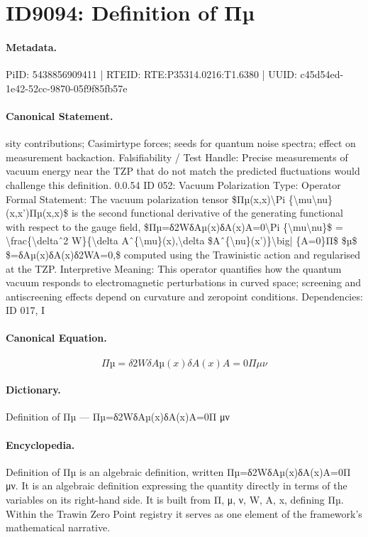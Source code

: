 \section*{ID9094: Definition of Πµ}
\paragraph{Metadata.}
PiID: 5438856909411 | RTEID: RTE:P35314.0216:T1.6380 | UUID: c45d54ed-1e42-52cc-9870-05f9f85fb57e

\paragraph{Canonical Statement.}
sity contributions; Casimirtype forces; seeds for quantum noise spectra; effect on measurement backaction. Falsifiability / Test Handle: Precise measurements of vacuum energy near the TZP that do not match the predicted fluctuations would challenge this definition. 0.0.54 ID 052: Vacuum Polarization Type: Operator Formal Statement: The vacuum polarization tensor \$Πµ(x,x)\textbackslash{}Pi \{\textbackslash{}mu\textbackslash{}nu\}(x,x’)Πµ(x,x)\$ is the second functional derivative of the generating functional with respect to the gauge field, \$Πµ=δ2WδAµ(x)δA(x)A=0\textbackslash{}Pi \{\textbackslash{}mu\textbackslash{}nu\}\$ = \textbackslash{}frac\{\textbackslash{}deltaˆ2 W\}\{\textbackslash{}delta Aˆ\{\textbackslash{}mu\}(x),\textbackslash{}delta \$Aˆ\{\textbackslash{}nu\}(x’)\}\textbackslash{}big| \{A=0\}Π\$ \$µ\$ \$=δAµ(x)δA(x)δ2WA=0,\$ computed using the Trawinistic action and regularised at the TZP. Interpretive Meaning: This operator quantifies how the quantum vacuum responds to electromagnetic perturbations in curved space; screening and antiscreening effects depend on curvature and zeropoint conditions. Dependencies: ID 017, I

\paragraph{Canonical Equation.}
\[
Πµ=δ2WδAµ(x)δA(x)A=0\Pi {\mu\nu}
\]

\paragraph{Dictionary.}
Definition of Πµ — Πµ=δ2WδAµ(x)δA(x)A=0Π μν

\paragraph{Encyclopedia.}
Definition of Πµ is an algebraic definition, written Πµ=δ2WδAµ(x)δA(x)A=0Π μν. It is an algebraic definition expressing the quantity directly in terms of the variables on its right-hand side. It is built from Π, μ, ν, W, A, x, defining Πµ. Within the Trawin Zero Point registry it serves as one element of the framework's mathematical narrative.
